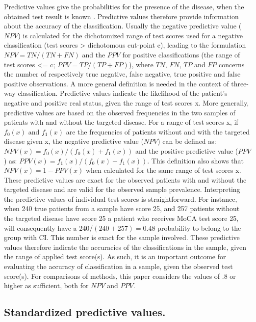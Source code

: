 \documentclass[
  nojss]{jss}
\begin{document}
Predictive values give the probabilities for the presence of the
disease, when the obtained test result is known
\citep{gallagher_problem_2003}. Predictive values therefore provide
information about the accuracy of the classification. Usually the
negative predictive value (\(NPV\)) is calculated for the dichotomized
range of test scores used for a negative classification (test scores
\textgreater{} dichotomous cut-point c), leading to the formulation
\(NPV = TN / (TN + FN)\) and the \(PPV\) for positive classifications
(the range of test scores \textless= c; \(PPV = TP / (TP + FP)\)), where
\(TN\), \(FN\), \(TP\) and \(FP\) concerns the number of respectively
true negative, false negative, true positive and false positive
observations. A more general definition is needed in the context of
three-way classification. Predictive values indicate the likelihood of
the patient's negative and positive real status, given the range of test
scores x. More generally, predictive values are based on the observed
frequencies in the two samples of patients with and without the targeted
disease. For a range of test scores x, if \(f_0(x)\) and \(f_1(x)\) are
the frequencies of patients without and with the targeted disease given
x, the negative predictive value (\(NPV\)) can be defined as:
\(NPV(x) = f_0(x) / (f_0(x) + f_1(x))\) and the positive predictive
value (\(PPV\)) as: \(PPV(x) = f_1(x) / (f_0(x) + f_1(x))\). This
definition also shows that \(NPV(x) = 1 - PPV(x)\) when calculated for
the same range of test scores x.\\
These predictive values are exact for the observed patients with and
without the targeted disease and are valid for the observed sample
prevalence. Interpreting the predictive values of individual test scores
is straightforward. For instance, when 240 true patients from a sample
have score 25, and 257 patients without the targeted disease have score
25 a patient who receives MoCA test score 25, will consequently have a
\(240 / (240 + 257) = 0.48\) probability to belong to the group with CI.
This number is exact for the sample involved. These predictive values
therefore indicate the accuracies of the classifications in the sample,
given the range of applied test score(s). As such, it is an important
outcome for evaluating the accuracy of classification in a sample, given
the observed test score(s). For comparisons of methods, this paper
considers the values of .8 or higher as sufficient, both for \(NPV\) and
\(PPV\).

\hypertarget{standardized-predictive-values.}{%
\subsection{Standardized predictive
values.}\label{standardized-predictive-values.}}
\end{document}
